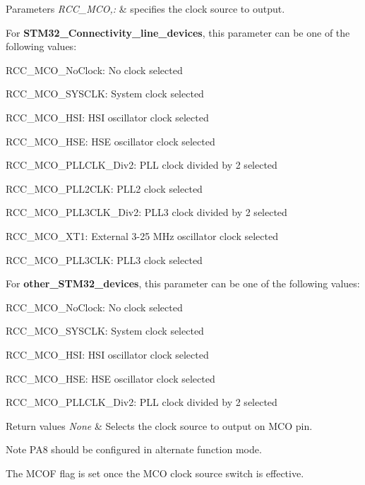 \begin{DoxyParams}{Parameters}
{\em R\-C\-C\-\_\-\-M\-C\-O,\-:} & specifies the clock source to output.\\
\hline
\end{DoxyParams}
For {\bfseries S\-T\-M32\-\_\-\-Connectivity\-\_\-line\-\_\-devices}, this parameter can be one of the following values\-: \begin{DoxyItemize}
\item R\-C\-C\-\_\-\-M\-C\-O\-\_\-\-No\-Clock\-: No clock selected \item R\-C\-C\-\_\-\-M\-C\-O\-\_\-\-S\-Y\-S\-C\-L\-K\-: System clock selected \item R\-C\-C\-\_\-\-M\-C\-O\-\_\-\-H\-S\-I\-: H\-S\-I oscillator clock selected \item R\-C\-C\-\_\-\-M\-C\-O\-\_\-\-H\-S\-E\-: H\-S\-E oscillator clock selected \item R\-C\-C\-\_\-\-M\-C\-O\-\_\-\-P\-L\-L\-C\-L\-K\-\_\-\-Div2\-: P\-L\-L clock divided by 2 selected \item R\-C\-C\-\_\-\-M\-C\-O\-\_\-\-P\-L\-L2\-C\-L\-K\-: P\-L\-L2 clock selected \item R\-C\-C\-\_\-\-M\-C\-O\-\_\-\-P\-L\-L3\-C\-L\-K\-\_\-\-Div2\-: P\-L\-L3 clock divided by 2 selected \item R\-C\-C\-\_\-\-M\-C\-O\-\_\-\-X\-T1\-: External 3-\/25 M\-Hz oscillator clock selected \item R\-C\-C\-\_\-\-M\-C\-O\-\_\-\-P\-L\-L3\-C\-L\-K\-: P\-L\-L3 clock selected\end{DoxyItemize}
For {\bfseries other\-\_\-\-S\-T\-M32\-\_\-devices}, this parameter can be one of the following values\-: \begin{DoxyItemize}
\item R\-C\-C\-\_\-\-M\-C\-O\-\_\-\-No\-Clock\-: No clock selected \item R\-C\-C\-\_\-\-M\-C\-O\-\_\-\-S\-Y\-S\-C\-L\-K\-: System clock selected \item R\-C\-C\-\_\-\-M\-C\-O\-\_\-\-H\-S\-I\-: H\-S\-I oscillator clock selected \item R\-C\-C\-\_\-\-M\-C\-O\-\_\-\-H\-S\-E\-: H\-S\-E oscillator clock selected \item R\-C\-C\-\_\-\-M\-C\-O\-\_\-\-P\-L\-L\-C\-L\-K\-\_\-\-Div2\-: P\-L\-L clock divided by 2 selected\end{DoxyItemize}

\begin{DoxyRetVals}{Return values}
{\em None} & Selects the clock source to output on M\-C\-O pin.\\
\hline
\end{DoxyRetVals}
\begin{DoxyNote}{Note}
P\-A8 should be configured in alternate function mode. 

The M\-C\-O\-F flag is set once the M\-C\-O clock source switch is effective. 
\end{DoxyNote}

